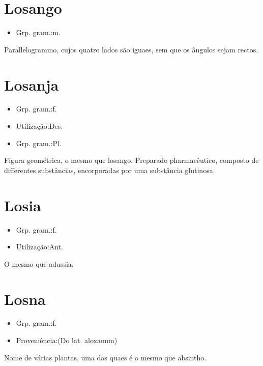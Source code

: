 \section{Losango}
\begin{itemize}
\item {Grp. gram.:m.}
\end{itemize}
Parallelogrammo, cujos quatro lados são iguaes, sem que os ângulos sejam rectos.
\section{Losanja}
\begin{itemize}
\item {Grp. gram.:f.}
\end{itemize}
\begin{itemize}
\item {Utilização:Des.}
\end{itemize}
\begin{itemize}
\item {Grp. gram.:Pl.}
\end{itemize}
Figura geométrica, o mesmo que \textunderscore losango\textunderscore .
Preparado pharmacêutico, composto de differentes substâncias, encorporadas por uma substância glutinosa.
\section{Losia}
\begin{itemize}
\item {Grp. gram.:f.}
\end{itemize}
\begin{itemize}
\item {Utilização:Ant.}
\end{itemize}
O mesmo que \textunderscore adussia\textunderscore .
\section{Losna}
\begin{itemize}
\item {Grp. gram.:f.}
\end{itemize}
\begin{itemize}
\item {Proveniência:(Do lat. \textunderscore aloxanum\textunderscore )}
\end{itemize}
Nome de várias plantas, uma das quaes é o mesmo que \textunderscore absintho\textunderscore .
